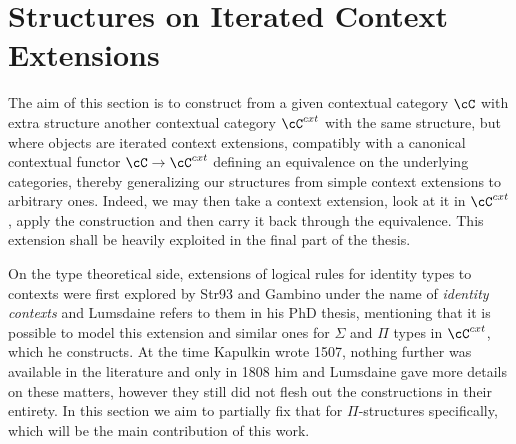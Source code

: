 \chapter*{Structures on Iterated Context Extensions}

The aim of this section is to construct from a given contextual category $\cC$
with extra structure another contextual category $\cC^{cxt}$ with the same
structure, but where objects are iterated context extensions, compatibly with a
canonical contextual functor $\cC\rightarrow\cC^{cxt}$ defining an equivalence
on the underlying categories, thereby
generalizing our structures from simple context extensions to arbitrary ones.
Indeed, we may then take a context extension, look at it in $\cC^{cxt}$, apply
the construction and then carry it back through the equivalence. This extension
shall be heavily exploited in the final part of the thesis.

On the type theoretical side, extensions of logical rules for identity types to
contexts were first explored by Str93 and Gambino  under the name of
\emph{identity contexts} and Lumsdaine refers to them in his PhD thesis,
mentioning that it is possible to model this extension and similar ones for
$\Sigma$ and $\Pi$ types in $\cC^{cxt}$, which he constructs. At the time
Kapulkin wrote 1507,
nothing further was available in the literature and only in 1808 him and
Lumsdaine gave more details on these matters, however they still did not flesh
out the constructions in their entirety. In this section we aim to partially fix
that for $\Pi$-structures specifically, which will be the main contribution of
this work.

